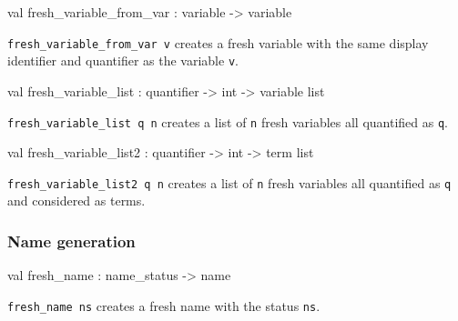 \label{val:Term.fresh-underscorevariable-underscorefrom-underscorevar}\begin{ocamldoccode}
val fresh_variable_from_var : variable -> variable
\end{ocamldoccode}
\begin{ocamldocdescription}
{\tt{fresh\_variable\_from\_var v}} creates a fresh variable 
    with the same display identifier and quantifier as the variable {\tt{v}}.


\end{ocamldocdescription}




\label{val:Term.fresh-underscorevariable-underscorelist}\begin{ocamldoccode}
val fresh_variable_list : quantifier -> int -> variable list
\end{ocamldoccode}
\begin{ocamldocdescription}
{\tt{fresh\_variable\_list q n}} creates a list of {\tt{n}} fresh variables all quantified as {\tt{q}}.


\end{ocamldocdescription}




\label{val:Term.fresh-underscorevariable-underscorelist2}\begin{ocamldoccode}
val fresh_variable_list2 : quantifier -> int -> term list
\end{ocamldoccode}
\begin{ocamldocdescription}
{\tt{fresh\_variable\_list2 q n}} creates a list of {\tt{n}} fresh variables all quantified as {\tt{q}} and considered as terms.


\end{ocamldocdescription}




\subsubsection{Name generation}




\label{val:Term.fresh-underscorename}\begin{ocamldoccode}
val fresh_name : name_status -> name
\end{ocamldoccode}
\begin{ocamldocdescription}
{\tt{fresh\_name ns}} creates a fresh name with the status {\tt{ns}}.


\end{ocamldocdescription}




